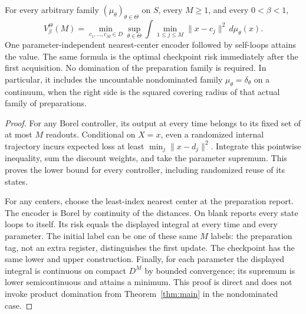 \begin{theorem}\label{thm:blind}
For every arbitrary family $(\mu_\theta)_{\theta\in\Theta}$ on $S$, every $M\ge1$, and every $0<\beta<1$,
\begin{equation}\label{eq:blind}
 V_\beta^\Theta(M)
 =\min_{c_1,\ldots,c_M\in D}\sup_{\theta\in\Theta}
      \int\min_{1\le j\le M}\|x-c_j\|^2\,d\mu_\theta(x).
\end{equation}
One parameter-independent nearest-center encoder followed by self-loops attains the value. The same formula is the optimal checkpoint risk immediately after the first acquisition. No domination of the preparation family is required. In particular, it includes the uncountable nondominated family $\mu_\theta=\delta_\theta$ on a continuum, when the right side is the squared covering radius of that actual family of preparations.
\end{theorem}
\begin{proof}
For any Borel controller, its output at every time belongs to its fixed set of at most $M$ readouts. Conditional on $X=x$, even a randomized internal trajectory incurs expected loss at least $\min_j\|x-d_j\|^2$. Integrate this pointwise inequality, sum the discount weights, and take the parameter supremum. This proves the lower bound for every controller, including randomized reuse of its states.

For any centers, choose the least-index nearest center at the preparation report. The encoder is Borel by continuity of the distances. On blank reports every state loops to itself. Its risk equals the displayed integral at every time and every parameter. The initial label can be one of these same $M$ labels: the preparation tag, not an extra register, distinguishes the first update. The checkpoint has the same lower and upper construction. Finally, for each parameter the displayed integral is continuous on compact $D^M$ by bounded convergence; its supremum is lower semicontinuous and attains a minimum. This proof is direct and does not invoke product domination from Theorem~\ref{thm:main} in the nondominated case.
\end{proof}

